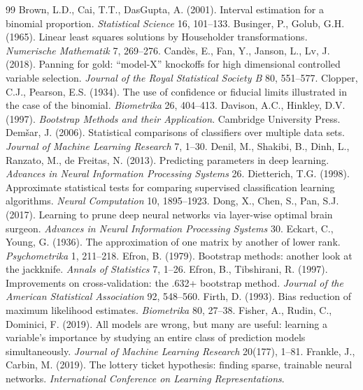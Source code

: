 \documentclass[11pt,a4paper]{article}
\theoremstyle{remark}\newtheorem{remark}{Remark}
\begin{document}
\begin{thebibliography}{99}
 Brown, L.D., Cai, T.T., DasGupta, A. (2001). Interval estimation for a binomial proportion. \emph{Statistical Science} 16, 101--133.
 Businger, P., Golub, G.H. (1965). Linear least squares solutions by Householder transformations. \emph{Numerische Mathematik} 7, 269--276.
 Cand\`es, E., Fan, Y., Janson, L., Lv, J. (2018). Panning for gold: ``model-X'' knockoffs for high dimensional controlled variable selection. \emph{Journal of the Royal Statistical Society B} 80, 551--577.
 Clopper, C.J., Pearson, E.S. (1934). The use of confidence or fiducial limits illustrated in the case of the binomial. \emph{Biometrika} 26, 404--413.
 Davison, A.C., Hinkley, D.V. (1997). \emph{Bootstrap Methods and their Application}. Cambridge University Press.
 Dem\v{s}ar, J. (2006). Statistical comparisons of classifiers over multiple data sets. \emph{Journal of Machine Learning Research} 7, 1--30.
 Denil, M., Shakibi, B., Dinh, L., Ranzato, M., de Freitas, N. (2013). Predicting parameters in deep learning. \emph{Advances in Neural Information Processing Systems} 26.
 Dietterich, T.G. (1998). Approximate statistical tests for comparing supervised classification learning algorithms. \emph{Neural Computation} 10, 1895--1923.
 Dong, X., Chen, S., Pan, S.J. (2017). Learning to prune deep neural networks via layer-wise optimal brain surgeon. \emph{Advances in Neural Information Processing Systems} 30.
 Eckart, C., Young, G. (1936). The approximation of one matrix by another of lower rank. \emph{Psychometrika} 1, 211--218.
 Efron, B. (1979). Bootstrap methods: another look at the jackknife. \emph{Annals of Statistics} 7, 1--26.
 Efron, B., Tibshirani, R. (1997). Improvements on cross-validation: the .632+ bootstrap method. \emph{Journal of the American Statistical Association} 92, 548--560.
 Firth, D. (1993). Bias reduction of maximum likelihood estimates. \emph{Biometrika} 80, 27--38.
 Fisher, A., Rudin, C., Dominici, F. (2019). All models are wrong, but many are useful: learning a variable's importance by studying an entire class of prediction models simultaneously. \emph{Journal of Machine Learning Research} 20(177), 1--81.
 Frankle, J., Carbin, M. (2019). The lottery ticket hypothesis: finding sparse, trainable neural networks. \emph{International Conference on Learning Representations}.

\end{thebibliography}
\end{document}
